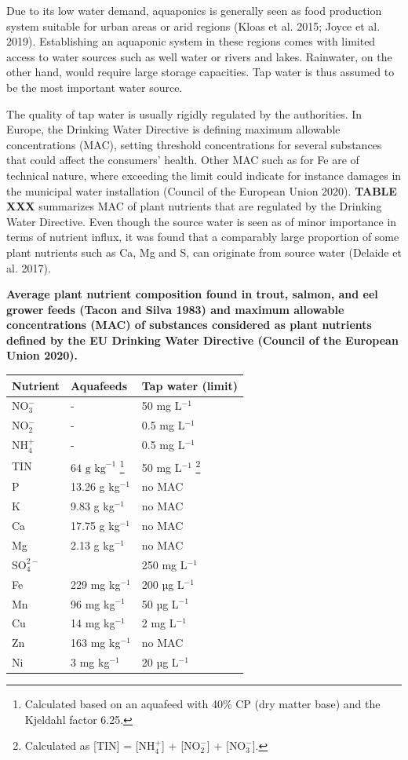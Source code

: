 \documentclass[
]{article}
\begin{document}
Due to its low water demand, aquaponics is generally seen as food production system suitable for urban areas or arid regions (Kloas et al. 2015; Joyce et al. 2019). Establishing an aquaponic system in these regions comes with limited access to water sources such as well water or rivers and lakes. Rainwater, on the other hand, would require large storage capacities. Tap water is thus assumed to be the most important water source.

The quality of tap water is usually rigidly regulated by the authorities. In Europe, the Drinking Water Directive is defining maximum allowable concentrations (MAC), setting threshold concentrations for several substances that could affect the consumers' health. Other MAC such as for Fe are of technical nature, where exceeding the limit could indicate for instance damages in the municipal water installation (Council of the European Union 2020). \textbf{TABLE XXX} summarizes MAC of plant nutrients that are regulated by the Drinking Water Directive. Even though the source water is seen as of minor importance in terms of nutrient influx, it was found that a comparably large proportion of some plant nutrients such as Ca, Mg and S, can originate from source water (Delaide et al. 2017).

\textbf{Average plant nutrient composition found in trout, salmon, and eel grower feeds (Tacon and Silva 1983) and maximum allowable concentrations (MAC) of substances considered as plant nutrients defined by the EU Drinking Water Directive (Council of the European Union 2020).}

\begin{longtable}[]{@{}lll@{}}
\toprule()
Nutrient & Aquafeeds & Tap water (limit) \\
\midrule()
\endhead
\(\text{NO}_{3}^{-}\) & - & 50 mg L\(^{-1}\) \\
\(\text{NO}_{2}^{-}\) & - & 0.5 mg L\(^{-1}\) \\
\(\text{NH}_{4}^{+}\) & - & 0.5 mg L\(^{-1}\) \\
TIN & \(64 \text{ g kg}^{-1}\) \footnote{Calculated based on an aquafeed with 40\% CP (dry matter base) and the Kjeldahl factor 6.25.} & 50 mg L\(^{-1}\) \footnote{Calculated as {[}TIN{]} = {[}\(\text{NH}_{4}^{+}\){]} + {[}\(\text{NO}_{2}^{-}\){]} + {[}\(\text{NO}_{3}^{-}\){]}.} \\
P & 13.26 g kg\(^{-1}\) & no MAC \\
K & 9.83 g kg\(^{-1}\) & no MAC \\
Ca & 17.75 g kg\(^{-1}\) & no MAC \\
Mg & 2.13 g kg\(^{-1}\) & no MAC \\
\(\text{SO}_{4}^{2-}\) & & 250 mg L\(^{-1}\) \\
Fe & 229 mg kg\(^{-1}\) & 200 µg L\(^{-1}\) \\
Mn & 96 mg kg\(^{-1}\) & 50 µg L\(^{-1}\) \\
Cu & 14 mg kg\(^{-1}\) & 2 mg L\(^{-1}\) \\
Zn & 163 mg kg\(^{-1}\) & no MAC \\
Ni & 3 mg kg\(^{-1}\) & 20 µg L\(^{-1}\) \\
\bottomrule()
\end{longtable}
\end{document}
